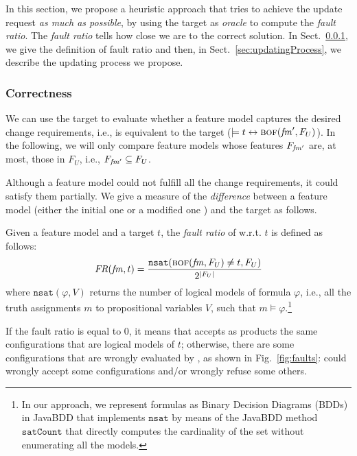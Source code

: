 \begin{tikzborder}{\cite{Gargantini16:validation}}
\begin{tikzborder}{\cite{gargantini_combinatorial_2017}}
\begin{tikzborder}{\cite{gargantini_combinatorial_2017}}
\begin{tikzborder}{\cite{garn2019}}
\begin{tikzborder}{\cite{arcaini2019achieving}}
	In this section, we propose a heuristic approach that tries to achieve the update request {\it as much as possible}, by using the target as {\it oracle} to compute the {\it fault ratio}. The \textit{fault ratio} tells how close we are to the correct solution. In Sect.~\ref{sec:correctness}, we give the definition of fault ratio and then, in Sect.~\ref{sec:updatingProcess}, we describe the updating process we propose.%
	
	\subsubsection{Correctness}\label{sec:correctness}
	
	We can use the target to evaluate whether a feature model \fmp captures the desired change requirements, i.e., \fmp is equivalent to the target ($\models t \leftrightarrow \textsc{bof}(\mathit{fm}^\prime, F_U)$). In the following, we will only compare feature models \fmp whose features $F_{\mathit{fm}^\prime}$ are, at most, those in $F_U$, i.e., $F_{\mathit{fm}^\prime} \subseteq F_U$.
	
	Although a feature model could not fulfill all the change requirements, it could satisfy them partially. We give a measure of the \emph{difference} between a feature model \fm (either the initial one \initFm or a modified one \fmp) and the target as follows.
	
	\begin{mydef}\label{def:faultratio}
		Given a feature model \fm and a target $t$, the \emph{fault ratio} of \fm w.r.t. $t$ is defined as follows:
		\begin{equation*}
		\mathit{FR}(\mathit{fm}, t) = \frac{\mathtt{nsat}(\textsc{bof}(\mathit{fm}, F_U) \neq t, F_U)}{2^{|F_U|}}
		\end{equation*}
		where $\mathtt{nsat}(\varphi, V)$ returns the number of logical models of formula $\varphi$, i.e., all the truth assignments $m$ to propositional variables $V$, such that $m \models \varphi$.\footnote{In our approach, we represent formulas as Binary Decision Diagrams (BDDs) in JavaBDD that implements $\mathtt{nsat}$ by means of the JavaBDD method $\mathtt{satCount}$ that directly computes the cardinality of the set without enumerating all the models.}
	\end{mydef}
	
	If the fault ratio is equal to 0, it means that \fm accepts as products the same configurations that are logical models of $t$; otherwise, there are some configurations that are wrongly evaluated by \fm, as shown in Fig.~\ref{fig:faults}: \fm could wrongly accept some configurations and/or wrongly refuse some others.
	

\end{tikzborder}
\end{tikzborder}
\end{tikzborder}
\end{tikzborder}
\end{tikzborder}

